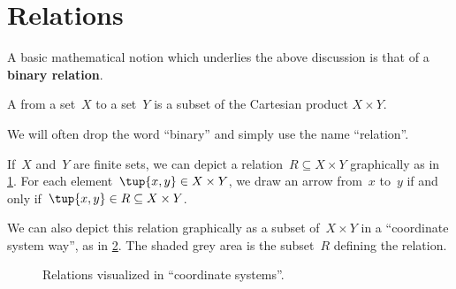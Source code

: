 
\section{Relations}\label{sec:connection-relations}

A basic mathematical notion which underlies the above discussion is that of a \textbf{binary relation}.


\begin{definition}
    \label{def:binary-relation}
    A \emph{} from a set~$X$ to a set~$Y$ is a subset of the Cartesian product $X\times Y$.
\end{definition}

\begin{remark}
    We will often drop the word ``binary'' and simply use the name ``relation''.
\end{remark}


If~$X$ and~$Y$ are finite sets, we can depict a relation~$R \subseteq X \times Y$ graphically as in \cref{fig:example_rel}. For each element~$\tup{x,y} \in X \times Y$, we draw an arrow from~$x$ to~$y$ if and only if~$\tup{x,y} \in R \subseteq X \times Y$.

\begin{figure}[h!]
    \centering
    \caption{\label{fig:example_rel}}
\end{figure}

We can also depict this relation graphically as a subset of~$X \times Y$ in a ``coordinate system way'', as in \cref{fig:example_rel_coord}. The shaded grey area is the subset~$R$ defining the relation.

\begin{comment}
    \begin{figure}[h!]
        \centering
        \texttt{[image: dist\_net\_8]}
        \caption{}
    \end{figure}
\end{comment}

\begin{figure}[h!]
    \begin{center}
    \end{center}
    \caption{Relations visualized in ``coordinate systems''.}
    \label{fig:example_rel_coord}
\end{figure}

